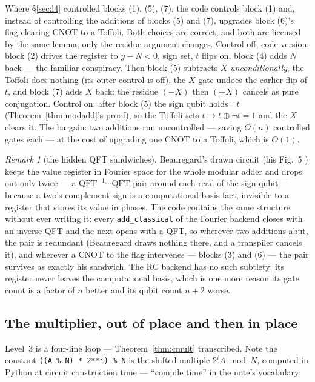 \documentclass[11pt]{article}
\newcommand{\code}[1]{\texttt{#1}}
\theoremstyle{plain}
\theoremstyle{remark}
\newtheorem*{remark}{Remark}
\begin{document}
\begin{keybox}[title={Two of seven, not three of seven}]
Where \S\ref{sec:l4} controlled blocks (1), (5), (7), the code controls block (1) and, instead of
controlling the additions of blocks (5) and (7), upgrades block (6)'s flag-clearing CNOT to a
Toffoli. Both choices are correct, and both are licensed by the same lemma; only the residue
argument changes. Control off, code version: block (2) drives the register to $y-N<0$, sign set,
$t$ flips on, block (4) adds $N$ back --- the familiar conspiracy. Then block (5) subtracts $X$
\emph{unconditionally}, the Toffoli does nothing (its outer control is off), the $X$ gate undoes
the earlier flip of $t$, and block (7) adds $X$ back: the residue $(-X)$ then $(+X)$ cancels as
pure conjugation. Control on: after block (5) the sign qubit holds $\neg t$
(Theorem~\ref{thm:modadd}'s proof), so the Toffoli sets $t\mapsto t\oplus\neg t=1$ and the $X$
clears it. The bargain: two additions run uncontrolled --- saving $O(n)$ controlled gates each ---
at the cost of upgrading one CNOT to a Toffoli, which is $O(1)$.
\end{keybox}

\begin{remark}[the hidden QFT sandwiches]
Beauregard's drawn circuit (his Fig.~5 \cite{beauregard}) keeps the value register in Fourier
space for the whole modular adder and drops out only twice --- a $\mathrm{QFT}^{-1}\cdots
\mathrm{QFT}$ pair around each read of the sign qubit --- because a two's-complement sign is a
computational-basis fact, invisible to a register that stores its value in phases. The code
contains the same structure without ever writing it: every \code{add\_classical} of the Fourier
backend closes with an inverse QFT and the next opens with a QFT, so wherever two additions abut,
the pair is redundant (Beauregard draws nothing there, and a transpiler cancels it), and wherever
a CNOT to the flag intervenes --- blocks (3) and (6) --- the pair survives as exactly his
sandwich. The RC backend has no such subtlety: its register never leaves the computational basis,
which is one more reason its gate count is a factor of $n$ better and its qubit count $n{+}2$
worse.
\end{remark}

\subsection{The multiplier, out of place and then in place}

Level~3 is a four-line loop --- Theorem~\ref{thm:cmult} transcribed. Note the constant
\code{((A \% N) * 2**i) \% N} is the shifted multiple $2^iA\bmod N$, computed in Python at circuit
construction time --- ``compile time'' in the note's vocabulary:
\end{document}
